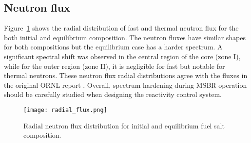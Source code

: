 \subsection{Neutron flux}
Figure~\ref{fig:radial_flux} shows the radial distribution of fast and thermal 
neutron flux for the both initial and equilibrium composition. The neutron fluxes
have similar shapes for both compositions but the equilibrium case has a harder 
spectrum. A significant spectral shift was observed in the central region of 
the core (zone I), while for the outer region (zone II), it is negligible for fast 
but notable for thermal neutrons. These neutron flux radial distributions 
agree with the fluxes in the original ORNL report \cite{robertson_conceptual_1971}. 
Overall, spectrum hardening during \gls{MSBR} operation should be carefully 
studied when designing the reactivity control system.
\begin{figure}[ht!] %
  \texttt{[image: radial\_flux.png]} \caption{Radial neutron 
  flux distribution for initial and equilibrium fuel salt composition.}
  \label{fig:radial_flux}
\end{figure}

